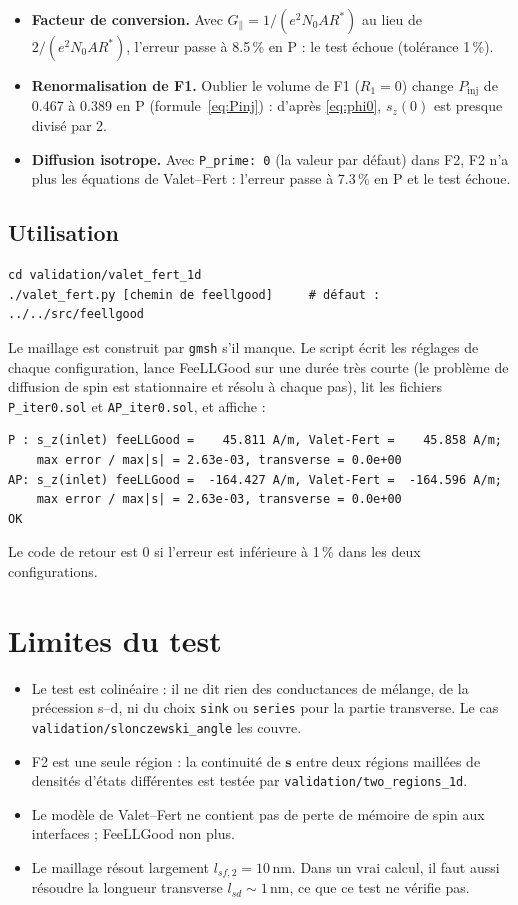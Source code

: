 \documentclass[11pt,a4paper]{article}
\newcommand{\vs}{\bm{s}}
\begin{document}
\begin{itemize}
  \item \textbf{Facteur de conversion.} Avec $G_\parallel = 1/(e^2N_0AR^*)$
    au lieu de $2/(e^2N_0AR^*)$, l'erreur passe à 8.5\,\% en P : le test
    échoue (tolérance 1\,\%).
  \item \textbf{Renormalisation de F1.} Oublier le volume de F1
    ($R_1 = 0$) change $P_{\mathrm{inj}}$ de 0.467 à 0.389 en P
    (formule~\eqref{eq:Pinj}) : d'après \eqref{eq:phi0}, $s_z(0)$ est
    presque divisé par 2.
  \item \textbf{Diffusion isotrope.} Avec \texttt{P\_prime: 0} (la
    valeur par défaut) dans F2, F2 n'a plus les équations de Valet--Fert :
    l'erreur passe à 7.3\,\% en P et le test échoue.
\end{itemize}

\subsection{Utilisation}

\begin{verbatim}
cd validation/valet_fert_1d
./valet_fert.py [chemin de feellgood]     # défaut : ../../src/feellgood
\end{verbatim}
Le maillage est construit par \texttt{gmsh} s'il manque. Le script
écrit les réglages de chaque configuration, lance FeeLLGood sur une durée
très courte (le problème de diffusion de spin est stationnaire et résolu
à chaque pas), lit les fichiers \texttt{P\_iter0.sol} et
\texttt{AP\_iter0.sol}, et affiche :
\begin{verbatim}
P : s_z(inlet) feeLLGood =    45.811 A/m, Valet-Fert =    45.858 A/m;
    max error / max|s| = 2.63e-03, transverse = 0.0e+00
AP: s_z(inlet) feeLLGood =  -164.427 A/m, Valet-Fert =  -164.596 A/m;
    max error / max|s| = 2.63e-03, transverse = 0.0e+00
OK
\end{verbatim}
Le code de retour est 0 si l'erreur est inférieure à 1\,\% dans les deux
configurations.

\section{Limites du test}

\begin{itemize}
  \item Le test est colinéaire : il ne dit rien des conductances de
    mélange, de la précession s--d, ni du choix \texttt{sink} ou
    \texttt{series} pour la partie transverse. Le cas
    \texttt{validation/slonczewski\_angle} les couvre.
  \item F2 est une seule région : la continuité de $\vs$ entre deux
    régions maillées de densités d'états différentes est testée par
    \texttt{validation/two\_regions\_1d}.
  \item Le modèle de Valet--Fert ne contient pas de perte de mémoire de
    spin aux interfaces ; FeeLLGood non plus.
  \item Le maillage résout largement $l_{sf,2} = 10$\,nm. Dans un vrai
    calcul, il faut aussi résoudre la longueur transverse
    $l_{sd}\sim1$\,nm, ce que ce test ne vérifie pas.
\end{itemize}
\end{document}
